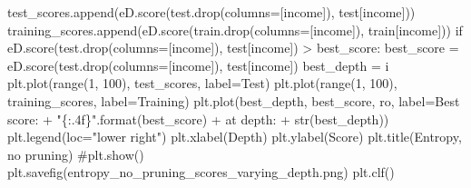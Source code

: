 \documentclass[
  letterpaper,
  DIV=11,
  numbers=noendperiod]{scrartcl}
\newenvironment{Shaded}{\begin{snugshade}}{\end{snugshade}}
\newcommand{\BuiltInTok}[1]{\textcolor[rgb]{0.00,0.23,0.31}{#1}}
\newcommand{\CommentTok}[1]{\textcolor[rgb]{0.37,0.37,0.37}{#1}}
\newcommand{\ControlFlowTok}[1]{\textcolor[rgb]{0.00,0.23,0.31}{#1}}
\newcommand{\DecValTok}[1]{\textcolor[rgb]{0.68,0.00,0.00}{#1}}
\newcommand{\NormalTok}[1]{\textcolor[rgb]{0.00,0.23,0.31}{#1}}
\newcommand{\OperatorTok}[1]{\textcolor[rgb]{0.37,0.37,0.37}{#1}}
\newcommand{\SpecialCharTok}[1]{\textcolor[rgb]{0.37,0.37,0.37}{#1}}
\newcommand{\StringTok}[1]{\textcolor[rgb]{0.13,0.47,0.30}{#1}}
\begin{document}
\begin{Shaded}
\begin{Highlighting}[]
\NormalTok{        test\_scores.append(eD.score(test.drop(columns}\OperatorTok{=}\NormalTok{[}\StringTok{\textquotesingle{}income\textquotesingle{}}\NormalTok{]), test[}\StringTok{\textquotesingle{}income\textquotesingle{}}\NormalTok{]))}
\NormalTok{        training\_scores.append(eD.score(train.drop(columns}\OperatorTok{=}\NormalTok{[}\StringTok{\textquotesingle{}income\textquotesingle{}}\NormalTok{]), train[}\StringTok{\textquotesingle{}income\textquotesingle{}}\NormalTok{]))}
        \ControlFlowTok{if}\NormalTok{ eD.score(test.drop(columns}\OperatorTok{=}\NormalTok{[}\StringTok{\textquotesingle{}income\textquotesingle{}}\NormalTok{]), test[}\StringTok{\textquotesingle{}income\textquotesingle{}}\NormalTok{]) }\OperatorTok{\textgreater{}}\NormalTok{ best\_score:}
\NormalTok{            best\_score }\OperatorTok{=}\NormalTok{ eD.score(test.drop(columns}\OperatorTok{=}\NormalTok{[}\StringTok{\textquotesingle{}income\textquotesingle{}}\NormalTok{]), test[}\StringTok{\textquotesingle{}income\textquotesingle{}}\NormalTok{])}
\NormalTok{            best\_depth }\OperatorTok{=}\NormalTok{ i}
\NormalTok{    plt.plot(}\BuiltInTok{range}\NormalTok{(}\DecValTok{1}\NormalTok{, }\DecValTok{100}\NormalTok{), test\_scores, label}\OperatorTok{=}\StringTok{\textquotesingle{}Test\textquotesingle{}}\NormalTok{)}
\NormalTok{    plt.plot(}\BuiltInTok{range}\NormalTok{(}\DecValTok{1}\NormalTok{, }\DecValTok{100}\NormalTok{), training\_scores, label}\OperatorTok{=}\StringTok{\textquotesingle{}Training\textquotesingle{}}\NormalTok{)}
\NormalTok{    plt.plot(best\_depth, best\_score, }\StringTok{\textquotesingle{}ro\textquotesingle{}}\NormalTok{, label}\OperatorTok{=}\StringTok{\textquotesingle{}Best score: \textquotesingle{}}
        \OperatorTok{+} \StringTok{"}\SpecialCharTok{\{:.4f\}}\StringTok{"}\NormalTok{.}\BuiltInTok{format}\NormalTok{(best\_score) }\OperatorTok{+} \StringTok{\textquotesingle{} at depth: \textquotesingle{}} \OperatorTok{+} \BuiltInTok{str}\NormalTok{(best\_depth))}
\NormalTok{    plt.legend(loc}\OperatorTok{=}\StringTok{"lower right"}\NormalTok{)}
\NormalTok{    plt.xlabel(}\StringTok{\textquotesingle{}Depth\textquotesingle{}}\NormalTok{)}
\NormalTok{    plt.ylabel(}\StringTok{\textquotesingle{}Score\textquotesingle{}}\NormalTok{)}
\NormalTok{    plt.title(}\StringTok{\textquotesingle{}Entropy, no pruning\textquotesingle{}}\NormalTok{)}
    \CommentTok{\#plt.show()}
\NormalTok{    plt.savefig(}\StringTok{\textquotesingle{}entropy\_no\_pruning\_scores\_varying\_depth.png\textquotesingle{}}\NormalTok{)}
\NormalTok{    plt.clf()}



\end{Highlighting}
\end{Shaded}
\end{document}
